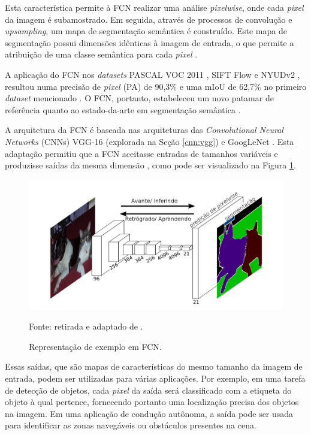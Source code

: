 Esta característica permite à FCN realizar uma análise \textit{pixelwise}, onde cada \textit{pixel} da imagem é subamostrado. Em seguida, através de processos de convolução e \textit{upsampling}, um mapa de segmentação semântica é construído. Este mapa de segmentação possui dimensões idênticas à imagem de entrada, o que permite a atribuição de uma classe semântica para cada \textit{pixel} \citep{Minaee2021, Zhang2018, Hesamian2019}.

A aplicação do FCN nos \textit{datasets} PASCAL VOC 2011 \citep{everingham2010pascal}, SIFT Flow \citep{Liu2011} e NYUDv2 \citep{Silberman:ECCV12}, resultou numa precisão de \textit{pixel} (PA) de 90,3\% e uma mIoU de 62,7\% no primeiro \textit{dataset} mencionado \citep{Ghosh2019}. O FCN, portanto, estabeleceu um novo patamar de referência quanto ao estado-da-arte em segmentação semântica \citep{Minaee2021}.

A arquitetura da FCN é baseada nas arquiteturas das \textit{Convolutional Neural Networks} (CNNs) VGG-16 (explorada na Seção \ref{cnn:vgg}) e GoogLeNet \citep{Szegedy2015}. Esta adaptação permitiu que a FCN aceitasse entradas de tamanhos variáveis e produzisse saídas da mesma dimensão \citep{Minaee2021}, como pode ser visualizado na Figura \ref{semantic:fig:6}.

\begin{figure}[H]
    \centering
    \caption{Representação de exemplo em FCN.}
    \includegraphics[width=1\linewidth]{recursos/imagens/semantic/fcn_example.png}
    \label{semantic:fig:6}

    Fonte: retirada e adaptado de \cite{Shelhamer2016}.
\end{figure}

Essas saídas, que são mapas de características do mesmo tamanho da imagem de entrada, podem ser utilizadas para várias aplicações. Por exemplo, em uma tarefa de detecção de objetos, cada \textit{pixel} da saída será classificado com a etiqueta do objeto à qual pertence, fornecendo portanto uma localização precisa dos objetos na imagem. Em uma aplicação de condução autônoma, a saída pode ser usada para identificar as zonas navegáveis ou obstáculos presentes na cena.

